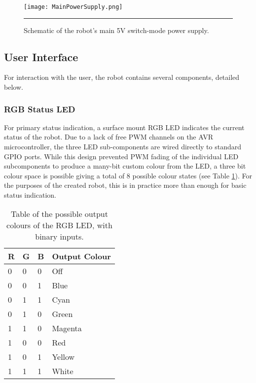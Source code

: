 \begin{figure}[tbph]
	\centering
		\texttt{[image: MainPowerSupply.png]}
	\rule{35em}{0.5pt}
	\caption[Main Power Supply Schematic]{Schematic of the robot's main 5V switch-mode power supply.}
	\label{fig:mainpowersupply}
\end{figure}

\FloatBarrier
\subsection{User Interface}

For interaction with the user, the robot contains several components, detailed below.

\FloatBarrier
\subsubsection{RGB Status LED}

For primary status indication, a surface mount RGB LED indicates the current status of the robot. Due to a lack of free PWM channels on the AVR microcontroller, the three LED sub-components are wired directly to standard GPIO ports. While this design prevented PWM fading of the individual LED subcomponents to produce a many-bit custom colour from the LED, a three bit colour space is possible giving a total of 8 possible colour states (see Table \ref{tab:rgbcolours}). For the purposes of the created robot, this is in practice more than enough for basic status indication.

\begin{table}[H]
	\begin{center}
		\begin{tabular}{ | l | l | l | l |}
			\hline
			\textbf{R}	& \textbf{G} & \textbf{B} & \textbf{Output Colour} \\ \hline

			0 & 0 & 0 & Off		\\ \hline
			0 & 0 & 1 & Blue	\\ \hline
			0 & 1 & 1 & Cyan	\\ \hline
			0 & 1 & 0 & Green	\\ \hline
			1 & 1 & 0 & Magenta	\\ \hline
			1 & 0 & 0 & Red		\\ \hline
			1 & 0 & 1 & Yellow	\\ \hline
			1 & 1 & 1 & White	\\ \hline
		\end{tabular}
		\caption[RGB LED Colour Table]{Table of the possible output colours of the RGB LED, with binary inputs.}
		\label{tab:rgbcolours}
	\end{center}
\end{table}

